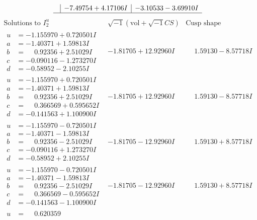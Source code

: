 \documentclass[1p]{elsarticle_modified}
\theoremstyle{definition}
\newcommand{\I}{\sqrt{-1}}
\begin{document}
$$\begin{array}{c|c|c}
 & -7.49754 + 4.17106 I & -3.10533 - 3.69910 I\\
 \hline 
 \end{array}$$\newpage$$\begin{array}{c|c|c}  
\text{Solutions to }I^u_{2}& \I (\text{vol} + \sqrt{-1}CS) & \text{Cusp shape}\\
 \hline 
\begin{aligned}
u &= -1.155970 + 0.720501 I \\
a &= -1.40371 + 1.59813 I \\
b &= \phantom{-}0.92356 + 2.51029 I \\
c &= -0.090116 - 1.273270 I \\
d &= -0.58952 - 2.10255 I\end{aligned}
 & -1.81705 + 12.92960 I & \phantom{-}1.59130 - 8.57718 I \\ \hline\begin{aligned}
u &= -1.155970 + 0.720501 I \\
a &= -1.40371 + 1.59813 I \\
b &= \phantom{-}0.92356 + 2.51029 I \\
c &= \phantom{-}0.366569 + 0.595652 I \\
d &= -0.141563 + 1.100900 I\end{aligned}
 & -1.81705 + 12.92960 I & \phantom{-}1.59130 - 8.57718 I \\ \hline\begin{aligned}
u &= -1.155970 - 0.720501 I \\
a &= -1.40371 - 1.59813 I \\
b &= \phantom{-}0.92356 - 2.51029 I \\
c &= -0.090116 + 1.273270 I \\
d &= -0.58952 + 2.10255 I\end{aligned}
 & -1.81705 - 12.92960 I & \phantom{-}1.59130 + 8.57718 I \\ \hline\begin{aligned}
u &= -1.155970 - 0.720501 I \\
a &= -1.40371 - 1.59813 I \\
b &= \phantom{-}0.92356 - 2.51029 I \\
c &= \phantom{-}0.366569 - 0.595652 I \\
d &= -0.141563 - 1.100900 I\end{aligned}
 & -1.81705 - 12.92960 I & \phantom{-}1.59130 + 8.57718 I \\ \hline\begin{aligned}
u &= \phantom{-}0.620359\phantom{ +0.000000I} \\

\end{aligned}
\end{array}$$
\end{document}
